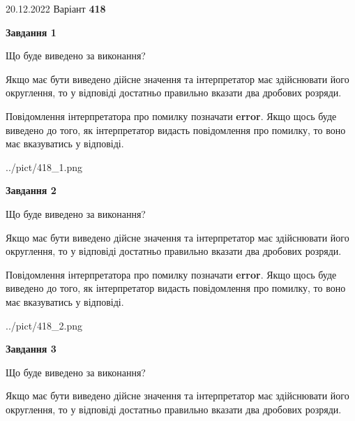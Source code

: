 \documentclass[12pt, ukrainian]{article}
\begin{document}
{20.12.2022 Варіант \No \textbf { 418 }\par}
{
\begin {Large}

{\begin {center}\textbf{Завдання 1}\end {center}}\par
Що буде виведено за виконання? \par

Якщо має бути виведено дійсне значення та інтерпретатор має здійснювати його округлення, 
то у відповіді достатньо правильно вказати два дробових розряди.

Повідомлення інтерпретатора про помилку позначати \textbf{error}.
Якщо щось буде виведено до того, як інтерпретатор видасть повідомлення про помилку, 
то воно має вказуватись у відповіді. \par

\begin{center}
	{../pict/418_1.png}
\end{center}
\newpage

{\begin {center}\textbf{Завдання 2}\end {center}}\par
Що буде виведено за виконання? \par

Якщо має бути виведено дійсне значення та інтерпретатор має здійснювати його округлення, 
то у відповіді достатньо правильно вказати два дробових розряди.

Повідомлення інтерпретатора про помилку позначати \textbf{error}.
Якщо щось буде виведено до того, як інтерпретатор видасть повідомлення про помилку, 
то воно має вказуватись у відповіді. \par

\begin{center}
	{../pict/418_2.png}
\end{center}
\newpage

{\begin {center}\textbf{Завдання 3}\end {center}}\par
Що буде виведено за виконання? \par

Якщо має бути виведено дійсне значення та інтерпретатор має здійснювати його округлення, 
то у відповіді достатньо правильно вказати два дробових розряди.


\end{Large}}
\end{document}
